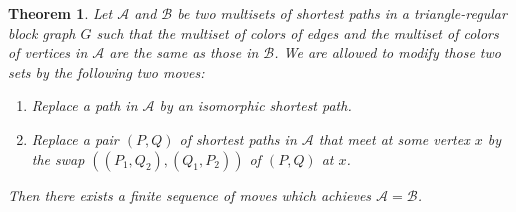 \documentclass[a4paper, 11pt]{amsart}
\newtheorem{theorem}{Theorem}
\numberwithin{theorem}{section}
\newcommand{\cA}{\mathcal{A}}
\begin{document}
\begin{theorem}\label{thm:sets-of-paths}
    Let $\mathcal A$ and $\mathcal B$ be two multisets of shortest paths in a triangle-regular block graph $G$ such that the multiset of colors of edges and the multiset of colors of vertices in $\mathcal{A}$ are the same as those in $\mathcal B$. We are allowed to modify those two sets by the following two moves:
    \begin{enumerate}
        \item Replace a path in $\cA$ by an isomorphic shortest path.
        \item Replace a pair $(P,Q)$ of shortest paths in $\cA$ that
	meet at some vertex $x$ by the swap $((P_1,Q_2),(Q_1,P_2))$ of
	$(P,Q)$ at $x$.
    \end{enumerate}
    Then there exists a finite sequence of moves which achieves $\mathcal A=\mathcal B$.
\end{theorem}
\end{document}
